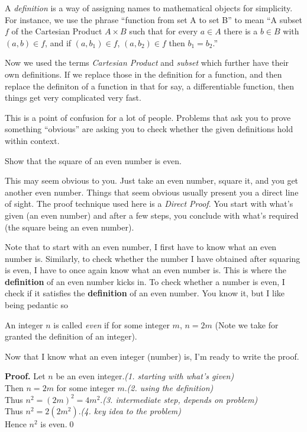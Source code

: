

A \textit{definition} is a way of assigning names to mathematical objects for simplicity. For instance, we use the phrase ``function from set A to set B'' to mean ``A subset $f$ of the Cartesian Product $A \times B$ such that for every $a \in A$ there is a $b \in B$ with $(a,b) \in f$, and if $(a, b_1) \in f$, $(a, b_2) \in f$ then $b_1 = b_2$.''

Now we used the terms \textit{Cartesian Product} and \textit{subset} which further have their own definitions. If we replace those in the definition for a function, and then replace the definiton of a function in that for say, a differentiable function, then things get very complicated very fast.

This is a point of confusion for a lot of people. Problems that ask you to prove something ``obvious'' are asking you to check whether the given definitions hold within context.

\begin{SNP}{\xmp}Show that the square of an even number is even.
\end{SNP}

This may seem obvious to you. Just take an even number, square it, and you get another even number. Things that seem obvious usually present you a direct line of sight. The proof technique used here is a \textit{Direct Proof}. You start with what's given (an even number) and after a few steps, you conclude with what's required (the square being an even number).

Note that to start with an even number, I first have to know what an even number is. Similarly, to check whether the number I have obtained after squaring is even, I have to once again know what an even number is. This is where the \textbf{definition} of an even number kicks in. To check whether a number is even, I check if it satisfies the \textbf{definition} of an even number. You know it, but I like being pedantic so

\begin{SNP}{\dfn} An integer $n$ is called \textit{even} if for some integer $m$, $n = 2m$ (Note we take for granted the definition of an integer).
\end{SNP}

Now that I know what an even integer (number) is, I'm ready to write the proof.

\begin{smrg}
\textbf{Proof.} Let $n$ be an even integer.\hfill{\footnotesize\itshape(1. starting with what's given)}\\
Then $n = 2m$ for some integer $m$.\hfill{\footnotesize\itshape(2. using the definition)}\\
Thus $n^2 = (2m)^2 = 4m^2$.\hfill{\footnotesize\itshape(3. intermediate step, depends on problem)}\\
Thus $n^2 = 2(2m^2)$.\hfill{\footnotesize\itshape(4. key idea to the problem)}\\
Hence $n^2$ is even.\qed
\end{smrg}

